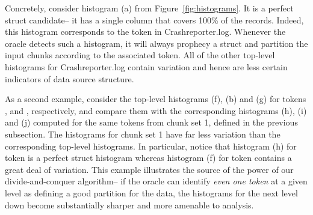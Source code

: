 \begin {figure*}
\begin{center}
\begin{minipage}[t]{0.59\columnwidth}
\end{minipage}
\hfill
\begin{minipage}[t]{0.53\columnwidth}
\end{minipage}
\hfill
\begin{minipage}[t]{0.295\columnwidth}
\end{minipage}
\hfill
\begin{minipage}[t]{0.59\columnwidth}
\end{minipage}
%
%
%
\caption{Histograms (a), (b), (c), (d), (e), (f) and
(g) are generated from top-level analysis of Crashreporter.log tokens.
The corresponding tokens are (a) {\tt [*]}, 
(b)  {\tt Pint}, (c) {\tt PDate}, (d) {\tt PTime}, (e) {\tt -}, (f) {\tt Palpha} and
(g) {\tt Pwhite}.  Histograms (h) {\tt Palpha}, (i) {\tt Pint}, and 
(j) {\tt Pwhite} are generated from analysis of Crashreporter.log from
set 1 (the second level of recursion).  Histogram (k) is generated from
top-level analysis of the {\tt |} token from the Sirius data.}
\label{fig:histograms} 
\end{center}
\end{figure*}

Concretely, consider histogram (a)
from Figure~\ref{fig:histograms}.  It is a perfect struct candidate--
it has a single column that covers 100\% of the records.  Indeed,
this histogram corresponds to the \cd{[*]} token in Crashreporter.log.
Whenever the oracle detects such a histogram, it will always prophecy
a struct and partition the input chunks according to the associated
token. All of the other top-level histograms for Crashreporter.log
contain variation and hence are less certain indicators of data source
structure. 

As a second example, consider the top-level histograms (f), (b) and
(g) for tokens ,  and , respectively, 
and compare them with the corresponding histograms (h),
(i) and (j) computed for the same tokens from chunk set 1, defined in the
previous subsection.  The histograms for chunk set 1 have far less variation
than the corresponding top-level histograms.  In particular, notice
that histogram (h) for token  is a perfect struct histogram
whereas histogram (f) for token 
contains a great deal of variation.  This example illustrates the
source of the power of our divide-and-conquer algorithm-- if the
oracle can identify {\em even one token} at a given level as
defining a good partition for the data, the histograms for the next
level down become substantially sharper and more amenable to analysis.

